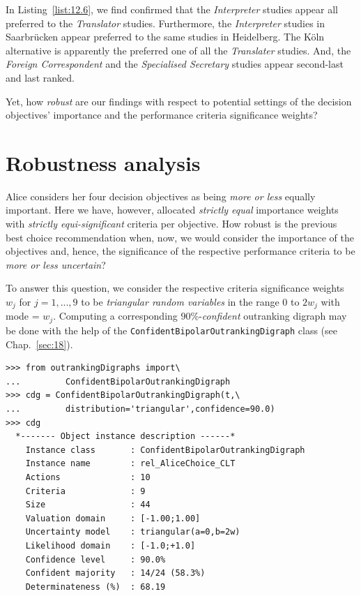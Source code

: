 In Listing~\vref{list:12.6}, we find confirmed that the \emph{Interpreter} studies appear all preferred to the \emph{Translator} studies. Furthermore, the \emph{Interpreter} studies in Saarbrücken appear preferred to the same studies in Heidelberg. The Köln alternative is apparently the preferred one of all the \emph{Translater} studies. And, the \emph{Foreign Correspondent} and the \emph{Specialised Secretary} studies appear second-last and last ranked.

Yet, how \emph{robust} are our findings with respect to potential settings of the decision objectives' importance and the performance criteria significance weights?
		
\section{Robustness analysis}
\label{sec:12.4}

Alice considers her four decision objectives as being \emph{more or less} equally important. Here we have, however, allocated \emph{strictly equal} importance weights with \emph{strictly equi-significant} criteria per objective. How robust is the previous best choice recommendation when, now, we would consider the importance of the objectives and, hence, the significance of the respective performance criteria to be \emph{more or less uncertain}?

To answer this question, we consider the respective criteria significance weights $w_j$ for $j=1,...,9$ to be \emph{triangular random variables} in the range 0 to $2w_j$ with mode = $w_j$. Computing a corresponding $90\%$-\emph{confident} outranking digraph may be done with the help of the \texttt{ConfidentBipolarOutrankingDigraph} class (see Chap.~\ref{sec:18}).
\begin{lstlisting}[caption={Computing the 90\% confident outranking digraph},label=list:12.7]
>>> from outrankingDigraphs import\
...         ConfidentBipolarOutrankingDigraph
>>> cdg = ConfidentBipolarOutrankingDigraph(t,\
...         distribution='triangular',confidence=90.0)
>>> cdg
  *------- Object instance description ------*
    Instance class       : ConfidentBipolarOutrankingDigraph
    Instance name        : rel_AliceChoice_CLT
    Actions              : 10
    Criteria             : 9
    Size                 : 44
    Valuation domain     : [-1.00;1.00]
    Uncertainty model    : triangular(a=0,b=2w) 
    Likelihood domain    : [-1.0;+1.0] 
    Confidence level     : 90.0% 
    Confident majority   : 14/24 (58.3%) 
    Determinateness (%)  : 68.19
\end{lstlisting}

